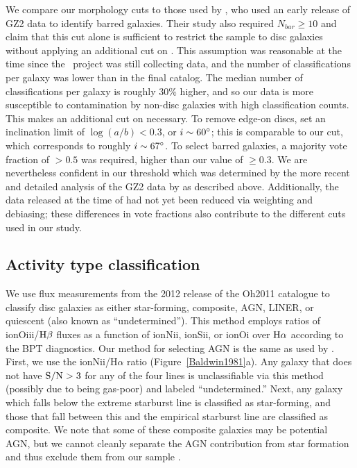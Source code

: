 We compare our morphology cuts to those used by \citet{Masters2011}, who used an early release of GZ2 data to identify barred galaxies. Their study also required $N_{bar}\ge10$ and claim that this cut alone is sufficient to restrict the sample to disc galaxies without applying an additional cut on \pfeatures. This assumption was reasonable at the time since the \gztwo~project was still collecting data, and the number of classifications per galaxy was lower than in the final catalog. The median number of classifications per galaxy is roughly 30\% higher, and so our data is more susceptible to contamination by non-disc galaxies with high classification counts. This makes an additional cut on \pfeatures necessary. To remove edge-on discs, \citet{Masters2011} set an inclination limit of $\log(a/b)<0.3$, or $i\sim60\mbox{$^\circ$}$; this is comparable to our \pnotedgeon cut, which corresponds to roughly $i\sim67\mbox{$^\circ$}$. To select barred galaxies, a majority vote fraction of \pbar$>0.5$ was required, higher than our value of \pbar$\ge0.3$. We are nevertheless confident in our threshold which was determined by the more recent and detailed analysis of the GZ2 data by \citet{Willett2013} as described above. Additionally, the data released at the time of \citet{Masters2011} had not yet been reduced via weighting and debiasing; these differences in vote fractions also contribute to the different cuts used in our study.
 
\subsection{Activity type classification}
\label{sec:Activity}
We use flux measurements from the 2012 release of the Oh2011 catalogue \citep{Oh2011} to classify disc galaxies as either star-forming, composite, AGN, LINER, or quiescent (also known as ``undetermined''). This method employs ratios of ion{O}{iii}/$\rm H\beta$ fluxes as a function of ion{N}{ii}, ion{S}{ii}, or ion{O}{i} over $\rm H\alpha$ according to the BPT diagnostics. Our method for selecting AGN is the same as used by \citet{Schawinski2007,Schawinski2010}. First, we use the ion{N}{ii}/H$\alpha$ ratio (Figure~\ref{Baldwin1981}a). Any galaxy that does not have $\rm S/N>3$ for any of the four lines is unclassifiable via this method (possibly due to being gas-poor) and labeled ``undetermined.'' Next, any galaxy which falls below the \citet{Kewley2001} extreme starburst line is classified as star-forming, and those that fall between this and the \citet{Kauffmann2003a} empirical starburst line are classified as composite. We note that some of these composite galaxies may be potential AGN, but we cannot cleanly separate the AGN contribution from star formation and thus exclude them from our sample \citep{Schawinski2010}. 

